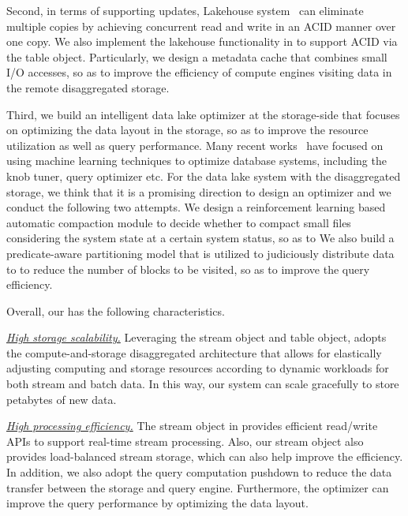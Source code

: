 Second, in terms of supporting updates, Lakehouse system~\cite{iceberg,hudi,delta} can eliminate multiple copies by achieving concurrent read and write in an ACID manner over one copy. We also implement the lakehouse functionality in \sys to support ACID via the table object.
Particularly, we design a metadata cache that combines small I/O accesses, so as to improve the efficiency of  compute engines visiting data in the remote disaggregated storage.

Third,  we build an intelligent data lake optimizer \brain at the storage-side that focuses on optimizing the data layout in the storage, so as to improve the resource utilization as well as  query performance. Many recent works~\cite{ottertune, cdbtune,deepdb,naru}  have focused on using machine learning techniques to  optimize database systems, including the knob tuner, query optimizer etc. For the data lake system with the disaggregated storage, we think that it is a promising direction to design an optimizer and we conduct the following two attempts.
 We design a reinforcement learning based automatic compaction module  to decide whether to compact small files considering the system state at a certain system status, so as to  We also build a predicate-aware partitioning model that is utilized to judiciously distribute data to  to reduce the number of blocks to be visited, so as to improve the query efficiency.  

Overall, our \sys has the following characteristics.

\noindent \underline{\textit{High storage scalability.}} Leveraging the stream object and table object, \sys adopts the compute-and-storage disaggregated architecture that allows for elastically adjusting computing and storage resources according to  dynamic workloads  for both stream and batch data. In this way, our system can  scale gracefully to store petabytes of new data.

\noindent \underline{\textit{High processing efficiency.}} The  stream object in \sys provides efficient read/write APIs to support real-time stream processing. Also, our stream object also provides load-balanced stream storage, which can also help  improve the efficiency. In addition, we also  adopt the query computation pushdown to reduce the data transfer between the storage and query engine. Furthermore, the \brain optimizer can improve the query performance by optimizing the data layout. 

